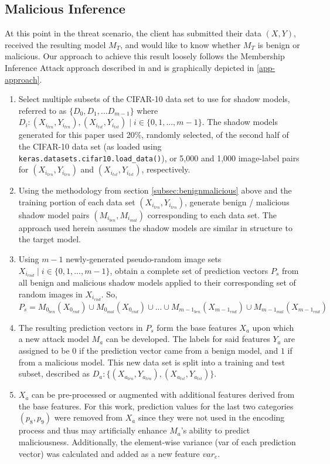 \subsection{Malicious Inference}
At this point in the threat scenario, the client has submitted their data $(X, Y)$, received the resulting model $M_{T}$, and would like to know whether $M_{T}$ is benign or malicious.  Our approach to achieve this result loosely follows the Membership Inference Attack approach described in \cite{DBLP:journals/corr/ShokriSS16} and is graphically depicted in \ref{app-approach}.

\begin{enumerate}
    \sloppy
    \item Select multiple subsets of the CIFAR-10 data set to use for shadow models, referred to as $\{D_0, D_1, ...D_{m-1}\}$ where $D_i: (X_{i_{trn}}, Y_{i_{trn}}), (X_{i_{tst}}, Y_{i_{tst}}) \mid i \in \{0, 1, ..., m-1\}$.  The shadow models generated for this paper used 20\%, randomly selected, of the second half of the CIFAR-10 data set (as loaded using \texttt{keras.datasets.cifar10.load\_data()}), or 5,000 and 1,000 image-label pairs for $(X_{i_{trn}}, Y_{i_{trn}})$ and $(X_{i_{tst}}, Y_{i_{tst}})$, respectively.
    \item Using the methodology from section \ref{subsec:benignmalicious} above and the training portion of each data set $(X_{i_{trn}}, Y_{i_{trn}})$, generate benign / malicious shadow model pairs $(M_{i_{ben}}, M_{i_{mal}})$ corresponding to each data set.  The approach used herein assumes the shadow models are similar in structure to the target model.
    \item Using $m-1$ newly-generated pseudo-random image sets $X_{i_{rnd}} \mid i \in \{0, 1, ..., m-1\}$, obtain a complete set of prediction vectors $P_s$ from all benign and malicious shadow models applied to their corresponding set of random images in $X_{i_{rnd}}$. So, $P_s = M_{0_{ben}}(X_{0_{rnd}}) \cup M_{0_{mal}}(X_{0_{rnd}}) \cup ... \cup M_{{m-1}_{ben}}(X_{{m-1}_{rnd}}) \cup M_{{m-1}_{mal}}(X_{{m-1}_{rnd}})$
    \item The resulting prediction vectors in $P_s$ form the base features $X_a$ upon which a new attack model $M_{a}$ can be developed.  The labels for said features $Y_a$ are assigned to be $0$ if the prediction vector came from a benign model, and $1$ if from a malicious model.  This new data set is split into a training and test subset, described as $D_{a}: \{(X_{a_{trn}},Y_{a_{trn}}), (X_{a_{tst}},Y_{a_{tst}})\}$.
    \item $X_a$ can be pre-processed or augmented with additional features derived from the base features. For this work, prediction values for the last two categories $(p_8, p_9)$ were removed from $X_a$ since they were not used in the encoding process and thus may artificially enhance $M_a$'s ability to predict maliciousness. Additionally, the element-wise variance (var of each prediction vector) was calculated and added as a new feature $var_e$. 

\end{enumerate}
